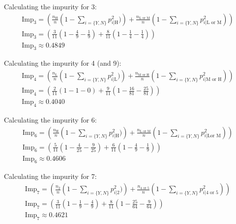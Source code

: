 \documentclass{article}
\begin{document}
\begin{flushleft}
Calculating the impurity for 3:
\begin{gather*}
\text{Imp}_{3} = \left(\frac{n_{\text{H}}}{n} \left(1 - \sum_{i = \{Y, N\}} p_{i | \text{H}}^{2})\right) + \frac{n_{\text{L or M}}}{n} \left(1 - \sum_{i = \{Y, N\}} p_{i | \text{L or M}}^{2}\right)\right) \\
\text{Imp}_{3} = \left(\frac{3}{11} \left(1 - \frac{4}{9} - \frac{1}{9}\right) + \frac{8}{11} \left(1 - \frac{1}{4} - \frac{1}{4}\right)\right) \\
\text{Imp}_{3} \approx \mathbf{0.4849} 
\end{gather*}

Calculating the impurity for 4 (and 9):
\begin{gather*}
\text{Imp}_{4} = \left(\frac{n_{\text{L}}}{n} \left(1 - \sum_{i = \{Y, N\}} p_{i | \text{L}}^{2})\right) + \frac{n_{\text{M or H}}}{n} \left(1 - \sum_{i = \{Y, N\}} p_{i | \text{M or H}}^{2}\right)\right) \\
\text{Imp}_{4} = \left(\frac{2}{11} \left(1 - 1 - 0\right) + \frac{9}{11} \left(1 - \frac{16}{81} - \frac{25}{81}\right)\right) \\
\text{Imp}_{4} \approx \mathbf{0.4040} 
\end{gather*}

Calculating the impurity for 6:
\begin{gather*}
\text{Imp}_{6} = \left(\frac{n_{\text{H}}}{n} \left(1 - \sum_{i = \{Y, N\}} p_{i | \text{H}}^{2})\right) + \frac{n_{\text{L or M}}}{n} \left(1 - \sum_{i = \{Y, N\}} p_{i | \text{Lor M}}^{2}\right)\right) \\
\text{Imp}_{6} = \left(\frac{5}{11} \left(1 - \frac{4}{25} - \frac{9}{25}\right) + \frac{6}{11} \left(1 - \frac{4}{9} - \frac{1}{9}\right)\right) \\
\text{Imp}_{6} \approx \mathbf{0.4606} 
\end{gather*}

Calculating the impurity for 7:
\begin{gather*}
\text{Imp}_{7} = \left(\frac{n_{\text{2}}}{n} \left(1 - \sum_{i = \{Y, N\}} p_{i | \text{2}}^{2})\right) + \frac{n_{\text{4 or 5}}}{n} \left(1 - \sum_{i = \{Y, N\}} p_{i | \text{4 or 5}}^{2}\right)\right) \\
\text{Imp}_{7} = \left(\frac{3}{11} \left(1 - \frac{1}{9} - \frac{4}{9}\right) + \frac{8}{11} \left(1 - \frac{25}{64} - \frac{9}{64}\right)\right) \\
\text{Imp}_{7} \approx \mathbf{0.4621} 
\end{gather*}


\end{flushleft}
\end{document}
